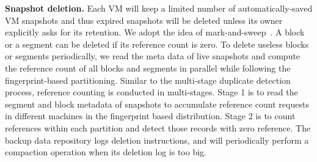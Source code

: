 {\bf Snapshot deletion.} Each VM will keep a limited number of  automatically-saved VM snapshots and thus
expired snapshots will be deleted unless its owner explicitly asks for its retention.
We adopt the idea of mark-and-sweep~\cite{Guo2011}. 
A block or a segment can be deleted if its reference count is zero.
To delete useless  blocks or segments periodically, we read the meta data  of live 
snapshots and compute the reference count of all blocks and segments  in parallel
while following the fingerprint-based partitioning.
Similar to the multi-stage duplicate detection process, reference counting is conducted in multi-stages. 
Stage  1 is to read  the segment and block  metadata of snapshots 
to accumulate  reference count requests in different machines  in the fingerprint based distribution.
Stage   2 is to count references within each partition and detect those records with zero 
reference. 
The backup  data repository logs deletion instructions,  and will periodically perform a compaction operation when 
its deletion log is too big. 




